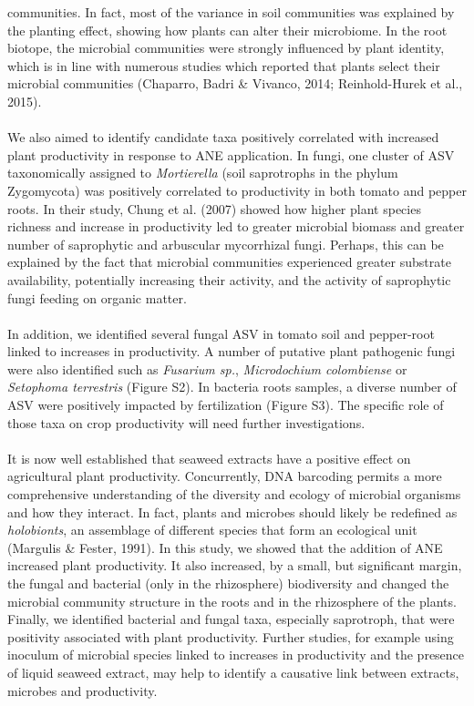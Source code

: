 \documentclass[12pt,]{article}
\begin{document}
communities. In fact, most of the variance in soil communities was
explained by the planting effect, showing how plants can alter their
microbiome. In the root biotope, the microbial communities were strongly
influenced by plant identity, which is in line with numerous studies
which reported that plants select their microbial communities (Chaparro,
Badri \& Vivanco, 2014; Reinhold-Hurek et al., 2015).\\
\hspace*{0.333em}\\
We also aimed to identify candidate taxa positively correlated with
increased plant productivity in response to ANE application. In fungi,
one cluster of ASV taxonomically assigned to \emph{Mortierella} (soil
saprotrophs in the phylum Zygomycota) was positively correlated to
productivity in both tomato and pepper roots. In their study, Chung et
al. (2007) showed how higher plant species richness and increase in
productivity led to greater microbial biomass and greater number of
saprophytic and arbuscular mycorrhizal fungi. Perhaps, this can be
explained by the fact that microbial communities experienced greater
substrate availability, potentially increasing their activity, and the
activity of saprophytic fungi feeding on organic matter.\\
\hspace*{0.333em}\\
In addition, we identified several fungal ASV in tomato soil and
pepper-root linked to increases in productivity. A number of putative
plant pathogenic fungi were also identified such as \emph{Fusarium sp.},
\emph{Microdochium colombiense} or \emph{Setophoma terrestris} (Figure
S2). In bacteria roots samples, a diverse number of ASV were positively
impacted by fertilization (Figure S3). The specific role of those taxa
on crop productivity will need further investigations.\\
\hspace*{0.333em}\\
It is now well established that seaweed extracts have a positive effect
on agricultural plant productivity. Concurrently, DNA barcoding permits
a more comprehensive understanding of the diversity and ecology of
microbial organisms and how they interact. In fact, plants and microbes
should likely be redefined as \emph{holobionts}, an assemblage of
different species that form an ecological unit (Margulis \& Fester,
1991). In this study, we showed that the addition of ANE increased plant
productivity. It also increased, by a small, but significant margin, the
fungal and bacterial (only in the rhizosphere) biodiversity and changed
the microbial community structure in the roots and in the rhizosphere of
the plants. Finally, we identified bacterial and fungal taxa, especially
saprotroph, that were positivity associated with plant productivity.
Further studies, for example using inoculum of microbial species linked
to increases in productivity and the presence of liquid seaweed extract,
may help to identify a causative link between extracts, microbes and
productivity.\\
\hspace*{0.333em}
\end{document}
